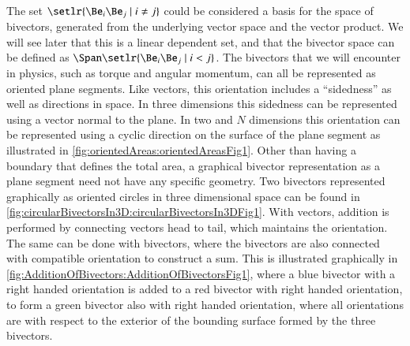 The set \( \setlr{ \Be_i \Be_j \mid i \ne j } \) could be considered a basis for the space of bivectors, generated from the underlying vector space and the vector product.
We will see later that this is a linear dependent set, and that the bivector space can be defined as \( \Span \setlr{ \Be_i \Be_j \mid i < j } \).
The bivectors that we will encounter in physics, such as torque and angular momentum, can all be represented as oriented plane
segments.
Like vectors, this orientation includes a ``sidedness'' as well as directions in space.
In three dimensions this sidedness can be represented using a vector normal to the plane.  In two and \( N \) dimensions this orientation can be
represented using a cyclic direction on the surface of the plane segment as illustrated in
\cref{fig:orientedAreas:orientedAreasFig1}.
Other than having a boundary that defines the total area, a graphical bivector representation as a plane segment need not have any specific geometry.
Two bivectors represented graphically as oriented circles in three dimensional space can be found in
\cref{fig:circularBivectorsIn3D:circularBivectorsIn3DFig1}.
With vectors, addition is performed by connecting vectors head to tail, which maintains the orientation.
The same can be done with bivectors, where the bivectors are also connected with compatible orientation to construct a sum.
This is illustrated graphically in \cref{fig:AdditionOfBivectors:AdditionOfBivectorsFig1}, where a blue bivector with a right handed orientation is added to a red bivector with right handed orientation, to form a green bivector also with right handed orientation, where all orientations are with respect to the exterior of the bounding surface formed by the three bivectors.

%

